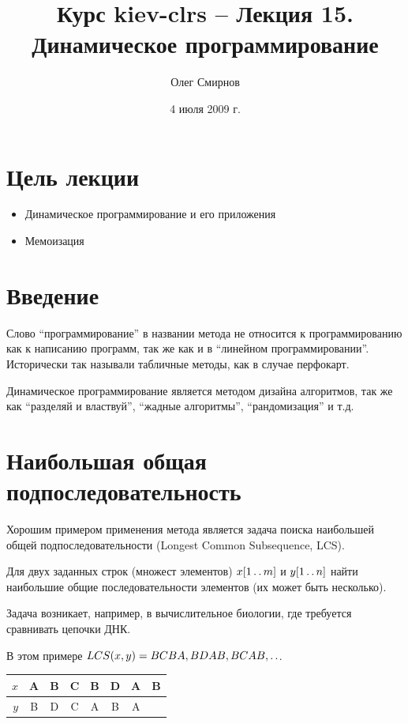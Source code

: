 \documentclass[11pt]{article}
\author{Олег Смирнов}
\title{Курс kiev-clrs -- Лекция 15. Динамическое программирование}
\date{4 июля 2009 г.}
\begin{document}
\maketitle
\tableofcontents

\newpage
\setlength{\parskip}{1ex plus 0.5ex minus 0.2ex}
\section{Цель лекции}
\begin{itemize}
\item Динамическое программирование и его приложения
\item Мемоизация
\end{itemize}

\section{Введение}
Слово ``программирование'' в названии метода не относится к программированию как к написанию программ, так же как и в ``линейном программировании''. Исторически так называли табличные методы, как в случае перфокарт.

Динамическое программирование является методом дизайна алгоритмов, так же как ``разделяй и властвуй'', ``жадные алгоритмы'', ``рандомизация'' и т.д.

\section{Наибольшая общая подпоследовательность}
Хорошим примером применения метода является задача поиска наибольшей общей подпоследовательности (Longest Common Subsequence, LCS).

Для двух заданных строк (множест элементов) $x[1 \mathinner{\ldotp\ldotp} m]$ и $y[1 \mathinner{\ldotp\ldotp} n]$ найти наибольшие общие последовательности элементов (их может быть несколько).

Задача возникает, например, в вычислительное биологии, где требуется сравнивать цепочки ДНК.

В этом примере $LCS(x, y) = BCBA, BDAB, BCAB, \mathinner{\ldotp\ldotp}$.
\begin{center}
\begin{tabular}{|r|c|c|c|c|c|c|c|}
  \hline
     $x$ & A & B & C & B & D & A & B \\
  \hline
     $y$ & B & D & C & A & B & A &   \\
  \hline
\end{tabular}
\end{center}
\end{document}
